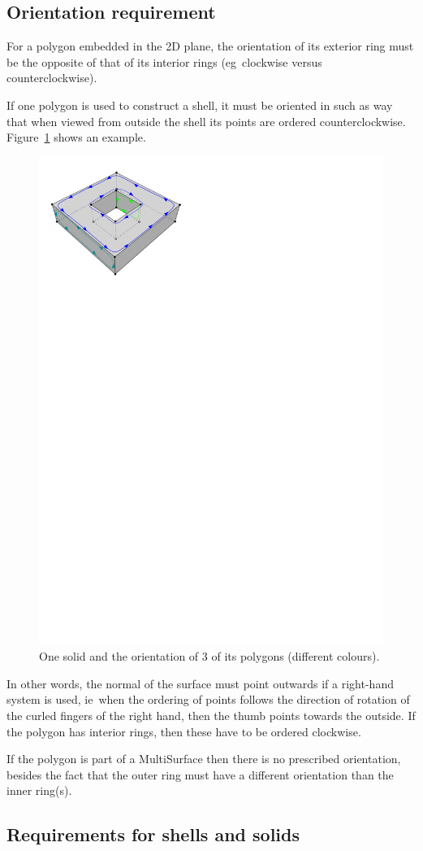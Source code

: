 \documentclass[a4paper,parskip=half,11pt]{scrartcl}
\newcommand{\ie}{ie}
\newcommand{\eg}{eg}
\begin{document}


\subsection{Orientation requirement}

For a polygon embedded in the 2D plane, the orientation of its exterior ring must be the opposite of that of its interior rings (\eg\ clockwise versus counterclockwise).

If one polygon is used to construct a shell, it must be oriented in such as way that when viewed from outside the shell its points are ordered counterclockwise.
Figure~\ref{fig:orientation} shows an example.
\begin{figure}
  \centering
  \includegraphics[width=0.5\linewidth]{figs/orientation.pdf}
  \caption{One solid and the orientation of 3 of its polygons (different colours).}
\label{fig:orientation}
\end{figure}
In other words, the normal of the surface must point outwards if a right-hand system is used, \ie\ when the ordering of points follows the direction of rotation of the curled fingers of the right hand, then the thumb points towards the outside.
If the polygon has interior rings, then these have to be ordered clockwise.

If the polygon is part of a MultiSurface then there is no prescribed orientation, besides the fact that the outer ring must have a different orientation than the inner ring(s).



\subsection{Requirements for shells and solids}
\end{document}
